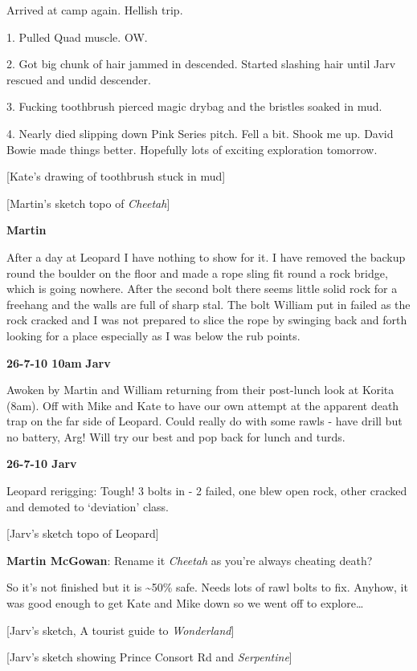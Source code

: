 Arrived at camp again. Hellish trip.

1. Pulled Quad muscle. OW.

2. Got big chunk of hair jammed in descended. Started slashing hair
until Jarv rescued and undid descender.

3. Fucking toothbrush pierced magic drybag and the bristles soaked in
mud.

4. Nearly died slipping down Pink Series pitch. Fell a bit. Shook me up.
David Bowie made things better. Hopefully lots of exciting exploration
tomorrow.

{[}Kate's drawing of toothbrush stuck in mud{]}

{[}Martin's sketch topo of \emph{Cheetah}{]}

\textbf{Martin}

After a day at Leopard I have nothing to show for it. I have removed the
backup round the boulder on the floor and made a rope sling fit round a
rock bridge, which is going nowhere. After the second bolt there seems
little solid rock for a freehang and the walls are full of sharp stal.
The bolt William put in failed as the rock cracked and I was not
prepared to slice the rope by swinging back and forth looking for a
place especially as I was below the rub points.

\textbf{26-7-10 10am} \textbf{Jarv}

Awoken by Martin and William returning from their post-lunch look at
Korita (8am). Off with Mike and Kate to have our own attempt at the
apparent death trap on the far side of Leopard. Could really do with
some rawls - have drill but no battery, Arg! Will try our best and pop
back for lunch and turds.

\textbf{26-7-10 Jarv}

Leopard rerigging: Tough! 3 bolts in - 2 failed, one blew open rock,
other cracked and demoted to `deviation' class.

{[}Jarv's sketch topo of Leopard{]}

\textbf{Martin McGowan}: Rename it \emph{Cheetah} as you're always
cheating death?

So it's not finished but it is \textasciitilde{}50\% safe. Needs lots of
rawl bolts to fix. Anyhow, it was good enough to get Kate and Mike down
so we went off to explore\ldots{}

{[}Jarv's sketch, A tourist guide to \emph{Wonderland}{]}

{[}Jarv's sketch showing Prince Consort Rd and \emph{Serpentine}{]}

